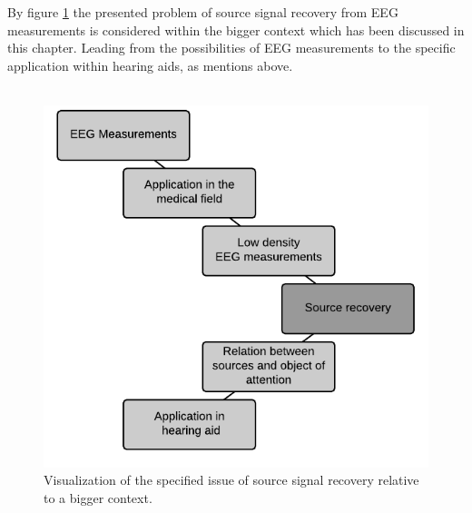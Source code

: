 By figure \ref{fig:problem} the presented problem of source signal recovery from EEG measurements is considered within the bigger context which has been discussed in this chapter. Leading from the possibilities of EEG measurements to the specific application within hearing aids, as mentions above.    
\\ \\
\begin{figure}[H]
\centering
\includegraphics[scale=0.85]{figures/ch_intro/system.png}
\caption{Visualization of the specified issue of source signal recovery relative to a bigger context.}
\label{fig:problem}
\end{figure}





